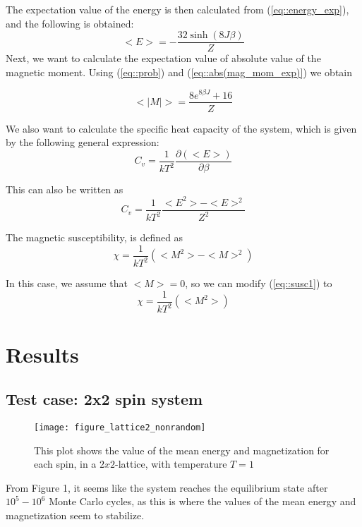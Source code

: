 \documentclass[12pt]{article}
\begin{document}
The expectation value of the energy is then calculated from (\ref{eq::energy_exp}), and the following is obtained: 
\begin{equation}\label{eq::expect_energy}
<E> =-\frac{32\sinh(8J\beta) }{Z} 
\end{equation}
Next, we want to calculate the expectation value of absolute value of the magnetic moment. Using (\ref{eq::prob}) and (\ref{eq::abs(mag_mom_exp)})   we obtain 

\begin{equation}\label{eq::magnetization_2_by_2}
<|M|> = \frac{8e^{8\beta J}+16}{Z}
\end{equation}

We also want to calculate the specific heat capacity of the system, which is given by the following general expression:
\begin{equation}
C_v = \frac{1}{kT^2}\frac{\partial(<E>)}{\partial\beta}
\end{equation}

This can also be written as 
\begin{equation}
C_v = \frac{1}{kT^2}\frac{<E^2>-<E>^2}{Z^2}
\end{equation}

The magnetic susceptibility, is defined as 
\begin{equation}\label{eq::susc1}
\chi = \frac{1}{kT^2}(<M^2>-<M>^2)
\end{equation}

In this case, we assume that $<M> = 0$, so we can modify (\ref{eq::susc1}) to 
\begin{equation}
\chi = \frac{1}{kT^2}(<M^2>)
\end{equation}


\section{Results}
\subsection{Test case: 2x2 spin system}
\begin{figure}[H]
\texttt{[image: figure\_lattice2\_nonrandom]}
\caption{This plot shows the value of the mean energy and magnetization for each spin, in a $2x2$-lattice, with temperature $T = 1$}
\end{figure}

From Figure 1, it seems like the system reaches the equilibrium state after $10^5-10^6$ Monte Carlo cycles, as this is where the values of the mean energy and magnetization seem to stabilize. 
\end{document}

